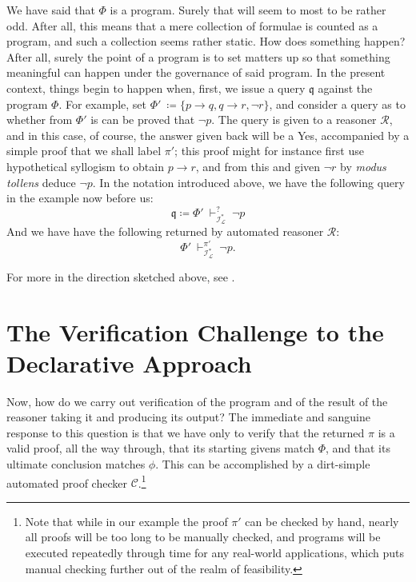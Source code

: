 \documentclass[11pt]{article}
\begin{document}
  We have said that $\Phi$ is a program.  Surely that will seem to
  most to be rather odd.  After all, this means that a mere collection
  of formulae is counted as a program, and such a collection seems
  rather static.  How does something happen?  After all, surely the
  point of a program is to set matters up so that something meaningful
  can happen under the governance of said program.  In the present
  context, things begin to happen when, first, we issue a query
  $\mathfrak{q}$ against the program $\Phi$.  For example, set
  $\Phi'\ \coloneqq \{p \rightarrow q, q \rightarrow r, \neg r\}$, and
  consider a query as to whether from $\Phi'$ is can be proved that
  $\neg p$.  The query is given to a reasoner $\mathcal{R}$, and in
  this case, of course, the answer given back will be a Yes,
  accompanied by a simple proof that we shall label $\pi'$; this proof
  might for instance first use hypothetical syllogism to obtain $p
  \rightarrow r$, and from this and given $\neg r$ by \textit{modus
    tollens} deduce $\neg p$.  In the notation introduced above, we
  have the following query in the example now before us:
  $$\mathfrak{q} \coloneqq \Phi'\ \vdash^?_{\mathcal{I}^\ast_\mathscr{L}}\ \neg p$$
%
  And we have have the following returned by automated reasoner $\mathcal{R}$:
$$\Phi'\ \vdash^{\pi'}_{\mathcal{I}^\ast_\mathscr{L}}\ \neg p.$$

  For more in the direction sketched above, see
  \cite{comp_sci_immaterial_formal_logic}.


  \section{The Verification Challenge to the Declarative Approach}
  \label{sect:ver_challenge_dec}

    Now, how do we carry out verification of the program and of the
    result of the reasoner taking it and producing its output?  The
    immediate and sanguine response to this question is that we have
    only to verify that the returned $\pi$ is a valid proof, all the
    way through, that its starting givens match $\Phi$, and that its
    ultimate conclusion matches $\phi$.  This can be accomplished by a
    dirt-simple automated proof checker $\mathcal{C}$.\footnote{Note
      that while in our example the proof $\pi'$ can be checked by
      hand, nearly all proofs will be too long to be manually checked,
      and programs will be executed repeatedly through time for any
      real-world applications, which puts manual checking further out
      of the realm of feasibility.}
\end{document}
